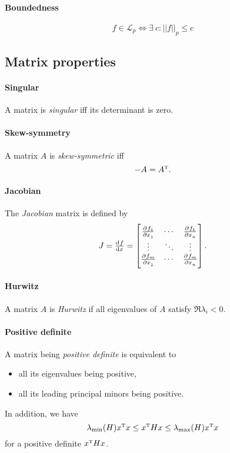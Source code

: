 \paragraph{Boundedness}
\begin{equation}
	f \in \mathcal{L}_p \Leftrightarrow \exists \: c : ||f||_p \leq c
\end{equation}

\subsection{Matrix properties}
\paragraph{Singular} A matrix is \emph{singular} iff its determinant is zero.

\paragraph{Skew-symmetry} A matrix $A$ is \emph{skew-symmetric} iff
\begin{equation}
	-A = A^{\scriptscriptstyle \mathrm{T}}
	.
\end{equation}

\paragraph{Jacobian} The \emph{Jacobian} matrix is defined by
\begin{equation}
	J
	=
	\od{f}{x}
	=
	\begin{bmatrix}
		\pd{f_1}{x_1} & \cdots & \pd{f_1}{x_n} \\
		\vdots        & \ddots & \vdots        \\
		\pd{f_m}{x_1} & \cdots & \pd{f_m}{x_n}
	\end{bmatrix}
	.
\end{equation}

\paragraph{Hurwitz}
A matrix $A$ is \emph{Hurwitz} if all eigenvalues of $A$ satisfy $\Re \lambda_i < 0$.

\paragraph{Positive definite} A matrix being \emph{positive definite} is equivalent to
\begin{itemize}
	\item all its eigenvalues being positive,
	\item all its leading principal minors being positive.
\end{itemize}
In addition, we have
\begin{equation}
	\lambda_{\mathrm{min}}(H) x^{\scriptscriptstyle \mathrm{T}} x \leq x^{\scriptscriptstyle \mathrm{T}} H x \leq \lambda_{\mathrm{max}}(H) x^{\scriptscriptstyle \mathrm{T}} x
\end{equation}
for a positive definite $x^{\scriptscriptstyle \mathrm{T}} H x$.